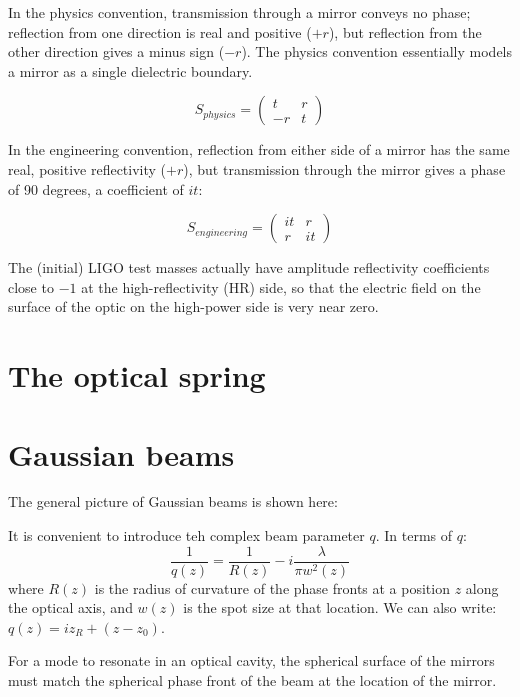 In the physics convention, transmission through a mirror conveys no
phase; reflection from one direction is real and positive ($+r$),
but reflection from the other direction gives a minus sign ($-r$).
The physics convention essentially models a mirror as a single dielectric
boundary.

\[
S_{physics}=\left(\begin{array}{cc}
t & r\\
-r & t
\end{array}\right)
\]

In the engineering convention, reflection from either side of a mirror
has the same real, positive reflectivity ($+r$), but transmission
through the mirror gives a phase of 90 degrees, a coefficient of $it$:

\[
S_{engineering}=\left(\begin{array}{cc}
it & r\\
r & it
\end{array}\right)
\]

The (initial) LIGO test masses actually have amplitude reflectivity
coefficients close to $-1$ at the high-reflectivity (HR) side, so
that the electric field on the surface of the optic on the high-power
side is very near zero.%

\section{The optical spring}



\section{Gaussian beams}

The general picture of Gaussian beams is shown here:

It is convenient to introduce teh complex beam parameter $q$.  In terms of $q$:
\begin{equation}
\frac{1}{q(z)} = \frac{1}{R(z)} - i \frac{\lambda}{\pi w^2(z)}
\end{equation}
where $R(z)$ is the radius of curvature of the phase fronts at a
position $z$ along the optical axis, and $w(z)$ is the spot size at
that location.  We can also write:
$q(z) = i z_R + (z - z_0)$.

For a mode to resonate in an optical cavity, the spherical surface of
the mirrors must match the spherical phase front of the beam at the
location of the mirror.

